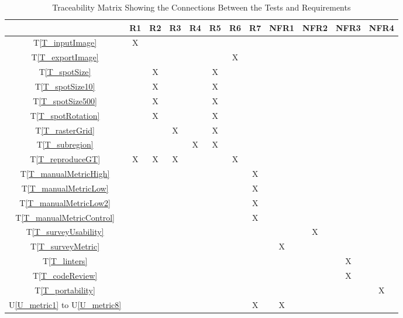 \documentclass[12pt, titlepage]{article}
\newcommand{\tref}[1]{T\ref{#1}}
\newcommand{\utref}[1]{U\ref{#1}}
\begin{document}
\begin{table}[h!]
  \centering
  \begin{tabular}{|c|c|c|c|c|c|c|c|c|c|c|c|}
  \hline
    & R1
    & R2
    & R3
    & R4
    & R5
    & R6
    & R7
    & NFR1
    & NFR2
    & NFR3
    & NFR4
  \\ \hline
  \tref{T_inputImage}           &X& & & & & & & & & & \\ \hline
  \tref{T_exportImage}          & & & & & &X& & & & & \\ \hline
  \tref{T_spotSize}             & &X& & &X& & & & & & \\ \hline
  \tref{T_spotSize10}           & &X& & &X& & & & & & \\ \hline
  \tref{T_spotSize500}          & &X& & &X& & & & & & \\ \hline
  \tref{T_spotRotation}         & &X& & &X& & & & & & \\ \hline
  \tref{T_rasterGrid}           & & &X& &X& & & & & & \\ \hline
  \tref{T_subregion}            & & & &X&X& & & & & & \\ \hline
  \tref{T_reproduceGT}          &X&X&X& & &X& & & & & \\ \hline
  \tref{T_manualMetricHigh}     & & & & & & &X& & & & \\ \hline
  \tref{T_manualMetricLow}      & & & & & & &X& & & & \\ \hline
  \tref{T_manualMetricLow2}     & & & & & & &X& & & & \\ \hline
  \tref{T_manualMetricControl}  & & & & & & &X& & & & \\ \hline
  \tref{T_surveyUsability}      & & & & & & & & &X& & \\ \hline
  \tref{T_surveyMetric}         & & & & & & & &X& & & \\ \hline
  \tref{T_linters}              & & & & & & & & & &X& \\ \hline
  \tref{T_codeReview}           & & & & & & & & & &X& \\ \hline
  \tref{T_portability}          & & & & & & & & & & &X\\ \hline
  \utref{U_metric1} to \utref{U_metric8} & & & & & & &X&X& & & \\ \hline
  \end{tabular}
  \caption{Traceability Matrix Showing the Connections Between the Tests and Requirements}
  \label{Table:A_trace}
\end{table}

\newpage
\clearpage
\end{document}
